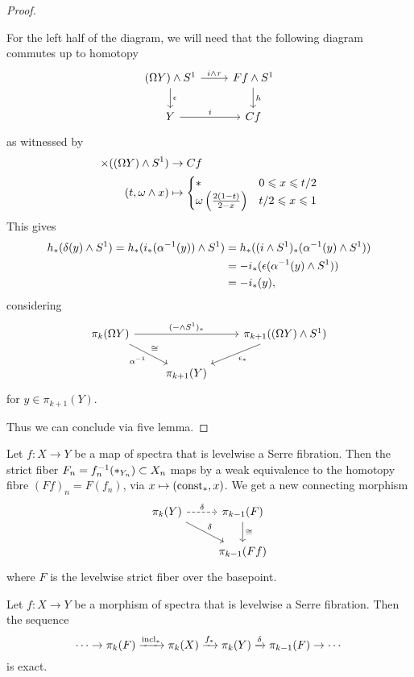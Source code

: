 \begin{proof}
\begin{claimproof}
For the left half of the diagram, we will need that the following diagram commutes up to homotopy
\[
\begin{tikzcd}
(\Omega Y)\smsh S^1 \ar[d,"\epsilon"] \ar[r,"i\smsh\tau"] & Ff\smsh S^1 \ar[d,"h"]\\
Y \ar[r,"i"] & Cf
\end{tikzcd}
\]
as witnessed by
\begin{align*}
    [0,1]\times((\Omega Y)\smsh S^1)&\to Cf\\
    (t,\omega\smsh x)&\mapsto\begin{cases}
    * & 0\leq x\leq t/2\\
    \omega\left(\frac{2(1-t)}{2-x}\right) & t/2\leq x\leq1
    \end{cases}
\end{align*}
This gives
\begin{align*}
    h_*(\delta(y)\smsh S^1)=h_*(i_*(\alpha^\inv(y))\smsh S^1)&=h_*((i\smsh S^1)_*(\alpha^\inv(y)\smsh S^1))\\
    &=-i_*(\epsilon(\alpha^\inv(y)\smsh S^1))\\
    &=-i_*(y),
\end{align*}
considering
\[
\begin{tikzcd}
\pi_{k}(\Omega Y) \ar[dr,"\alpha^\inv"',"\cong"] \ar[rr,"(-\smsh S^1)_*"] & & \pi_{k+1}((\Omega Y)\smsh S^1) \ar[dl,"\epsilon_*"]\\
 & \pi_{k+1}(Y) & 
\end{tikzcd}
\]
for $y\in\pi_{k+1}(Y)$.\end{claimproof}
Thus we can conclude via five lemma.
\end{proof}

Let $f:X\to Y$ be a map of spectra that is levelwise a Serre fibration. Then the strict fiber $F_n=f^{-1}_n(*_{Y_n})\subset X_n$ maps by a weak equivalence to the homotopy fibre $(Ff)_n=F(f_n)$, via $x\mapsto(\operatorname{const}_*,x)$. We get a new connecting morphism
\[
\begin{tikzcd}
\pi_k(Y) \ar[dr,"\delta"] \ar[r,"\delta",dashed] & \pi_{k-1}(F) \ar[d,"\cong"]\\
 & \pi_{k-1}(Ff)
\end{tikzcd}
\]
where $F$ is the levelwise strict fiber over the basepoint.

\begin{corollary}
Let $f:X\to Y$ be a morphism of spectra that is levelwise a Serre fibration. Then the sequence
\[\cdots\to\pi_k(F)\xrightarrow{\operatorname{incl}_*}\pi_k(X)\xrightarrow{f_*}\pi_k(Y)\xrightarrow{\delta}\pi_{k-1}(F)\to\cdots\]
is exact.
\end{corollary}

